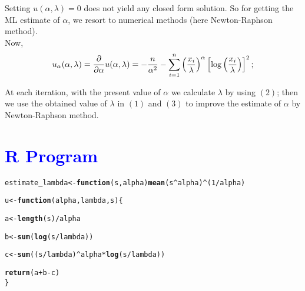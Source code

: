 \documentclass[11pt, a4paper]{article}\usepackage[]{graphicx}\usepackage[]{xcolor}
\makeatletter
\newcommand{\hlnum}[1]{\textcolor[rgb]{0.686,0.059,0.569}{#1}}%
\newcommand{\hlopt}[1]{\textcolor[rgb]{0,0,0}{#1}}%
\newcommand{\hldef}[1]{\textcolor[rgb]{0.345,0.345,0.345}{#1}}%
\newcommand{\hlkwa}[1]{\textcolor[rgb]{0.161,0.373,0.58}{\textbf{#1}}}%
\newcommand{\hlkwb}[1]{\textcolor[rgb]{0.69,0.353,0.396}{#1}}%
\newcommand{\hlkwc}[1]{\textcolor[rgb]{0.333,0.667,0.333}{#1}}%
\newcommand{\hlkwd}[1]{\textcolor[rgb]{0.737,0.353,0.396}{\textbf{#1}}}%
\newenvironment{kframe}{%
 \def\at@end@of@kframe{}%
 \ifinner\ifhmode%
  \def\at@end@of@kframe{\end{minipage}}%
  \begin{minipage}{\columnwidth}%
 \fi\fi%
 \def\FrameCommand##1{\hskip\@totalleftmargin \hskip-\fboxsep
 \colorbox{shadecolor}{##1}\hskip-\fboxsep
     \hskip-\linewidth \hskip-\@totalleftmargin \hskip\columnwidth}%
 \MakeFramed {\advance\hsize-\width
   \@totalleftmargin\z@ \linewidth\hsize
   \@setminipage}}%
 {\par\unskip\endMakeFramed%
 \at@end@of@kframe}
\newenvironment{knitrout}{}{} %
\makeatother
\begin{document}
Setting $u(\alpha, \lambda) = 0$ does not yield any closed form solution. So for getting the ML estimate of $\alpha$, we resort to numerical methods (here Newton-Raphson method). \\[1em]

Now, 
\begin{equation}
u_{\alpha}(\alpha, \lambda) = \dfrac{\partial}{\partial \alpha} u(\alpha, \lambda) = -\dfrac{n}{\alpha^2} - \sum \limits_{i=1}^{n} \left( \dfrac{x_i}{\lambda} \right)^{\alpha} \left[ \log \left( \dfrac{x_i}{\lambda} \right) \right]^2;\\[0.3cm]
\end{equation}

At each iteration, with the present value of $\alpha$ we calculate $\lambda$ by using $(2)$; then we use the obtained value of $\lambda$ in $(1)$ and $(3)$ to improve the estimate of $\alpha$ by Newton-Raphson method.

\section*{\faArrowAltCircleRight[regular] \textcolor{blue}{R Program}}

\begin{knitrout}
\color{fgcolor}\begin{kframe}
\begin{alltt}
\hldef{estimate_lambda} \hlkwb{<-} \hlkwa{function}\hldef{(}\hlkwc{s}\hldef{,} \hlkwc{alpha}\hldef{)} \hlkwd{mean}\hldef{(s}\hlopt{^}\hldef{alpha)}\hlopt{^}\hldef{(}\hlnum{1}\hlopt{/}\hldef{alpha)}
\end{alltt}
\end{kframe}
\end{knitrout}

\begin{knitrout}
\color{fgcolor}\begin{kframe}
\begin{alltt}
\hldef{u} \hlkwb{<-} \hlkwa{function}\hldef{(}\hlkwc{alpha}\hldef{,} \hlkwc{lambda}\hldef{,} \hlkwc{s}\hldef{)\{}

  \hldef{a} \hlkwb{<-} \hlkwd{length}\hldef{(s)} \hlopt{/} \hldef{alpha}

  \hldef{b} \hlkwb{<-} \hlkwd{sum}\hldef{(}\hlkwd{log}\hldef{(s} \hlopt{/} \hldef{lambda))}

  \hldef{c} \hlkwb{<-} \hlkwd{sum}\hldef{((s} \hlopt{/} \hldef{lambda)}\hlopt{^}\hldef{alpha} \hlopt{*} \hlkwd{log}\hldef{(s} \hlopt{/} \hldef{lambda))}

  \hlkwd{return}\hldef{(a} \hlopt{+} \hldef{b} \hlopt{-} \hldef{c)}
\hldef{\}}
\end{alltt}
\end{kframe}
\end{knitrout}
\end{document}
